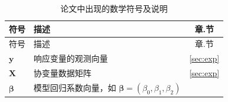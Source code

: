\documentclass[12pt,a4paper,UTF8,twoside]{book}
\theoremstyle{definition}
\theoremstyle{definition}
\theoremstyle{definition}
\theoremstyle{remark}
\begin{document}
\begin{longtable}[]{@{}llc@{}}
\caption{\label{tab:math-symbols} 论文中出现的数学符号及说明}\tabularnewline
\toprule
\begin{minipage}[b]{0.15\columnwidth}\raggedright
符号\strut
\end{minipage} & \begin{minipage}[b]{0.63\columnwidth}\raggedright
描述\strut
\end{minipage} & \begin{minipage}[b]{0.14\columnwidth}\centering
章.节\strut
\end{minipage}\tabularnewline
\midrule
\endfirsthead
\toprule
\begin{minipage}[b]{0.15\columnwidth}\raggedright
符号\strut
\end{minipage} & \begin{minipage}[b]{0.63\columnwidth}\raggedright
描述\strut
\end{minipage} & \begin{minipage}[b]{0.14\columnwidth}\centering
章.节\strut
\end{minipage}\tabularnewline
\midrule
\endhead
\begin{minipage}[t]{0.15\columnwidth}\raggedright
\(\mathbf{y}\)\strut
\end{minipage} & \begin{minipage}[t]{0.63\columnwidth}\raggedright
响应变量的观测向量\strut
\end{minipage} & \begin{minipage}[t]{0.14\columnwidth}\centering
\ref{sec:exp}\strut
\end{minipage}\tabularnewline
\begin{minipage}[t]{0.15\columnwidth}\raggedright
\(\mathbf{X}\)\strut
\end{minipage} & \begin{minipage}[t]{0.63\columnwidth}\raggedright
协变量数据矩阵\strut
\end{minipage} & \begin{minipage}[t]{0.14\columnwidth}\centering
\ref{sec:exp}\strut
\end{minipage}\tabularnewline
\begin{minipage}[t]{0.15\columnwidth}\raggedright
\(\boldsymbol{\beta}\)\strut
\end{minipage} & \begin{minipage}[t]{0.63\columnwidth}\raggedright
模型回归系数向量，如
\(\boldsymbol{\beta} = (\beta_0,\beta_1,\beta_2)\)\strut
\end{minipage} & \begin{minipage}[t]{0.14\columnwidth}\centering

\end{minipage}
\end{longtable}
\end{document}
